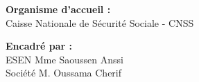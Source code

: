 \begin{titlepage}
{\large \textbf{Organisme d'accueil :}} \\
{\large Caisse Nationale de Sécurité Sociale - CNSS} \\
\vspace{0.8cm}

{\large \textbf{Encadré par :}} \\
{\large ESEN\hspace{1cm} Mme Saoussen Anssi} \\
{\large Société \hspace{1cm} M. Oussama Cherif} \\

\vspace*{\fill} %
\end{titlepage}
\restoregeometry